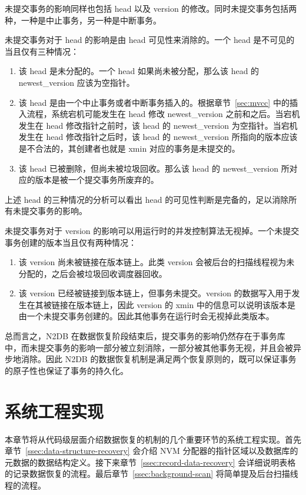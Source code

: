 未提交事务的影响同样也包括 head 以及 version 的修改。同时未提交事务包括两种，一种是中止事务，另一种是中断事务。

未提交事务对于 head 的影响是由 head 可见性来消除的。一个 head 是不可见的当且仅有三种情况：
\begin{enumerate}
    \item 该 head 是未分配的。一个 head 如果尚未被分配，那么该 head 的 newest\_version 应该为空指针。
    \item 该 head 是由一个中止事务或者中断事务插入的。根据章节~\ref{sec:mvcc} 中的插入流程，系统宕机可能发生在 head 修改 newest\_version 之前和之后。当宕机发生在 head 修改指针之前时，该 head 的 newest\_version 为空指针。当宕机发生在 head 修改指针之后时，该 head 的 newest\_version 所指向的版本应该是不合法的，其创建者也就是 xmin 对应的事务是未提交的。
    \item 该 head 已被删除，但尚未被垃圾回收。那么该 head 的 newest\_version 所对应的版本是被一个提交事务所废弃的。
\end{enumerate}
上述 head 的三种情况的分析可以看出 head 的可见性判断是完备的，足以消除所有未提交事务的影响。

未提交事务对于 version 的影响可以用运行时的并发控制算法无视掉。一个未提交事务创建的版本当且仅有两种情况：
\begin{enumerate}
    \item 该 version 尚未被链接在版本链上。此类 version 会被后台的扫描线程视为未分配的，之后会被垃圾回收调度器回收。
    \item 该 version 已经被链接到版本链上，但事务未提交。version 的数据写入用于发生在其被链接在版本链上，因此 version 的 xmin 中的信息可以说明该版本是由一个未提交事务创建的。因此其他事务在运行时会无视掉此类版本。
\end{enumerate}

总而言之，N2DB 在数据恢复阶段结束后，提交事务的影响仍然存在于事务库中，而未提交事务的影响一部分被立刻消除，一部分被其他事务无视，并且会被异步地消除。因此 N2DB 的数据恢复机制是满足两个恢复原则的，既可以保证事务的原子性也保证了事务的持久化。

\section{系统工程实现}

本章节将从代码级层面介绍数据恢复的机制的几个重要环节的系统工程实现。首先章节~\ref{ssec:data-structure-recovery} 会介绍 NVM 分配器的指针区域以及数据库的元数据的数据结构定义。接下来章节~\ref{ssec:record-data-recovery} 会详细说明表格的记录数据恢复的流程。最后章节~\ref{ssec:background-scan} 将简单提及后台扫描线程的流程。

